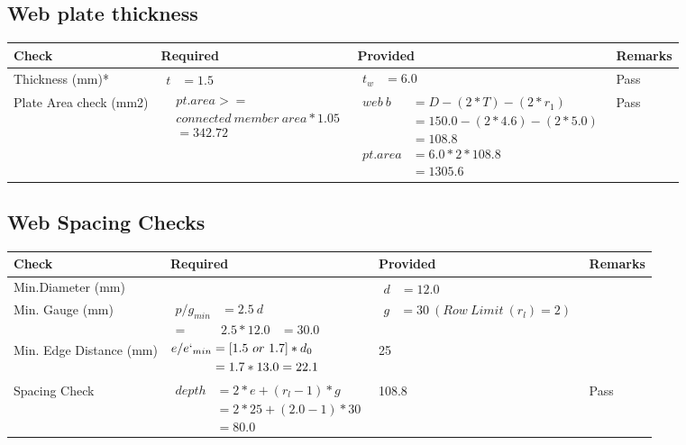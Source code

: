 \documentclass{article}%
\begin{document}
\subsection{Web plate thickness}%
\label{subsec:Webplatethickness}%
\renewcommand{\arraystretch}{1.2}%
\begin{longtable}{|p{2.5cm}|p{4.5cm}|p{7cm}|p{1.5cm}|}%
\hline%
\rowcolor{OsdagGreen}%
Check&Required&Provided&Remarks\\%
\hline%
\endhead%
\hline%
Thickness (mm)*&$\begin{aligned} t &=1.5\end{aligned}$&$\begin{aligned} t_w &=6.0\end{aligned}$&Pass\\%
\hline%
Plate Area check (mm2)&$\begin{aligned} &pt.area >= \\&connected~member~area * 1.05\\  &= 342.72\end{aligned}$&$\begin{aligned} web~b &= D-(2*T)-(2*r_1)\\ &=150.0-(2*4.6)-(2*5.0)\\ &= 108.8 \\  pt.area &= 6.0*2* 108.8\\ &= 1305.6\end{aligned}$&Pass\\%
\hline%
\end{longtable}

%
\newpage%
\subsection{Web Spacing Checks}%
\label{subsec:WebSpacingChecks}%
\renewcommand{\arraystretch}{1.2}%
\begin{longtable}{|p{2.5cm}|p{7.5cm}|p{5cm}|p{1cm}|}%
\hline%
\rowcolor{OsdagGreen}%
Check&Required&Provided&Remarks\\%
\hline%
\endhead%
\hline%
Min.Diameter (mm)&&$\begin{aligned} d &=12.0\end{aligned}$&\\%
\hline%
Min. Gauge (mm)&$\begin{aligned}p/g_{min}&= 2.5 ~ d&\\ =&2.5*12.0&=30.0\end{aligned}$&$\begin{aligned} g &=30~(Row~Limit~(r_l) = 2)\end{aligned}$&\\%
\hline%
Min. Edge Distance (mm)&$\begin{aligned}e/e`_{min} &=[1.5~or~ 1.7] * d_0\\ &=1.7*13.0=22.1 \end{aligned}$&25&\\%
\hline%
Spacing Check&$\begin{aligned} depth & = 2 * e + (r_l -1) * g\\ & = 2 * 25+(2.0-1)*30\\ & = 80.0\end{aligned}$&108.8&Pass\\%
\hline%
\end{longtable}
\end{document}

